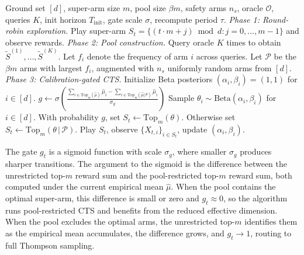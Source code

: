 \documentclass{article}
\theoremstyle{plain}
\theoremstyle{definition}
\theoremstyle{remark}
\newcommand{\Pool}{\mathcal{P}}
\newcommand{\algname}{Pool-CTS-CG}
\begin{document}
\begin{algorithm}[t]
\caption{\algname{}: Calibration-Gated Pool-CTS}
\label{alg:pool-cts-cg}
\begin{algorithmic}[1]
\REQUIRE Ground set $[d]$, super-arm size $m$, pool size $\beta m$, safety arms $n_s$, oracle $\mathcal{O}$, queries $K$, init horizon $T_{\mathrm{init}}$, gate scale $\sigma$, recompute period $\tau$.
\STATE \textit{Phase 1: Round-robin exploration.}
  \STATE Play super-arm $S_t = \{(t \cdot m + j) \bmod d : j = 0, \dots, m-1\}$ and observe rewards.
\ENDFOR
\STATE \textit{Phase 2: Pool construction.}
\STATE Query oracle $K$ times to obtain $\tilde{S}^{(1)}, \dots, \tilde{S}^{(K)}$. Let $f_i$ denote the frequency of arm $i$ across queries.
\STATE Let $\Pool$ be the $\beta m$ arms with largest $f_i$, augmented with $n_s$ uniformly random arms from $[d]$.
\STATE \textit{Phase 3: Calibration-gated CTS.}
\STATE Initialize Beta posteriors $(\alpha_i, \beta_i) = (1,1)$ for $i \in [d]$.
    \STATE $g \leftarrow \sigma\!\left(\frac{\sum_{i \in \mathrm{Top}_m(\hat{\mu})} \hat{\mu}_i - \sum_{i \in \mathrm{Top}_m(\hat{\mu} | \Pool)} \hat{\mu}_i}{\sigma_g}\right)$
  \ENDIF
  \STATE Sample $\theta_i \sim \mathrm{Beta}(\alpha_i, \beta_i)$ for $i \in [d]$.
  \STATE With probability $g$, set $S_t \leftarrow \mathrm{Top}_m(\theta)$.
  \STATE Otherwise set $S_t \leftarrow \mathrm{Top}_m(\theta \,|\, \Pool)$.
  \STATE Play $S_t$, observe $\{X_{t,i}\}_{i \in S_t}$, update $(\alpha_i, \beta_i)$.
\ENDFOR
\end{algorithmic}
\end{algorithm}

The gate $g_t$ is a sigmoid function with scale $\sigma_g$, where smaller $\sigma_g$ produces sharper transitions. The argument to the sigmoid is the difference between the unrestricted top-$m$ reward sum and the pool-restricted top-$m$ reward sum, both computed under the current empirical mean $\hat{\mu}$. When the pool contains the optimal super-arm, this difference is small or zero and $g_t \approx 0$, so the algorithm runs pool-restricted CTS and benefits from the reduced effective dimension. When the pool excludes the optimal arms, the unrestricted top-$m$ identifies them as the empirical mean accumulates, the difference grows, and $g_t \to 1$, routing to full Thompson sampling.
\end{document}
